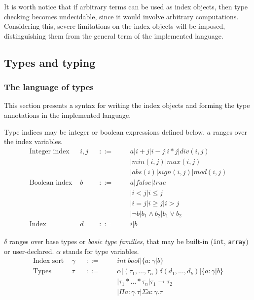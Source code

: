 \documentclass[a4paper,UKenglish]{lipics-v2016}
\begin{document}
It is worth notice that if arbitrary terms can be used as index objects, then
type checking becomes undecidable, since it would involve arbitrary
computations.  Considering this, severe limitations on the index objects will
be imposed, distinguishing them from the general term of the implemented
language.

\subsection{Types and typing}

\subsubsection{The language of types}
This section presents a syntax for writing the index objects and forming the
type annotations in the implemented language.

Type indices may be integer or boolean expressions defined below.
$a$ ranges over the index variables.
\begin{align*}
  \text{Integer index } & i,j &&::= &&& a|i+j|i-j|i*j|div(i,j)\\
                &     &&    &&& |min(i,j)|max(i,j)\\
                &     &&    &&& |abs(i)|sign(i,j)|mod(i,j)\\
  \text{Boolean index } & b &&::= &&& a|false|true\\
                &     &&    &&& |i < j | i \leq j \\
                &     &&    &&& |i = j|i \geq j | i > j\\
                &     &&    &&& |\neg b| b_1 \land b_2 | b_1 \lor b_2\\
  \text{Index } & d &&::= &&& i|b
\end{align*}

$\delta$ ranges over base types or \emph{basic type families}, that may be built-in
(\texttt{int}, \texttt{array}) or user-declared. $\alpha$ stands for type variables.
\begin{align*}
  \text{Index sort } & \gamma &&::= &&& int | bool | \{ a: \gamma | b \}\\
  \text{Types } & \tau &&::= &&& \alpha | (\tau_1, \dots, \tau_n)\delta (d_1, \dots, d_k) | \{ a: \gamma | b \}\\
                &      &&    &&& | \tau_1 * \dots * \tau_n | \tau_1 \to \tau_2\\
                &      &&    &&& | \Pi a: \gamma. \tau | \Sigma a: \gamma. \tau
\end{align*}
\end{document}
